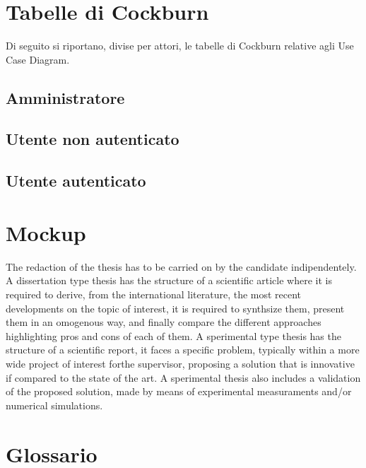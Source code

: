 \section{Tabelle di Cockburn}
Di seguito si riportano, divise per attori, le tabelle di Cockburn relative agli Use Case Diagram.
\subsection{Amministratore}


\pagebreak
\subsection{Utente non autenticato}



\pagebreak[2]
\subsection{Utente autenticato}
\pagebreak
\section{Mockup}

The redaction of the thesis has to be carried on by the candidate indipendentely. A dissertation type thesis has the structure of a scientific article where it is required to derive, from the international literature, the most recent developments on the topic of interest, it is required to synthsize them, present them in an omogenous way, and finally compare the different approaches highlighting pros and cons of each of them. A sperimental type thesis has the structure of a scientific report, it faces a specific problem, typically within a more wide project of interest forthe supervisor, proposing a solution that is innovative if compared to the state of the art. A sperimental thesis also includes a validation of the proposed solution, made by means of experimental measuraments and/or numerical simulations.

\section{Glossario}

